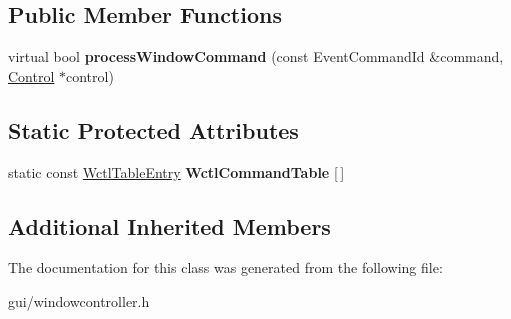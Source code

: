 \subsection*{Public Member Functions}
\begin{DoxyCompactItemize}
\item 
virtual bool {\bfseries process\+Window\+Command} (const Event\+Command\+Id \&command, \hyperlink{classControl}{Control} $\ast$control)\hypertarget{classWctlBase_a8b41c76977c2726158a53a9daac30591}{}\label{classWctlBase_a8b41c76977c2726158a53a9daac30591}

\end{DoxyCompactItemize}
\subsection*{Static Protected Attributes}
\begin{DoxyCompactItemize}
\item 
static const \hyperlink{structWindowControllerTableEntry}{Wctl\+Table\+Entry} {\bfseries Wctl\+Command\+Table} \mbox{[}$\,$\mbox{]}\hypertarget{classWctlBase_a9f0c14c4ccdd938cc334a4c03aaab719}{}\label{classWctlBase_a9f0c14c4ccdd938cc334a4c03aaab719}

\end{DoxyCompactItemize}
\subsection*{Additional Inherited Members}


The documentation for this class was generated from the following file\+:\begin{DoxyCompactItemize}
\item 
gui/windowcontroller.\+h\end{DoxyCompactItemize}

